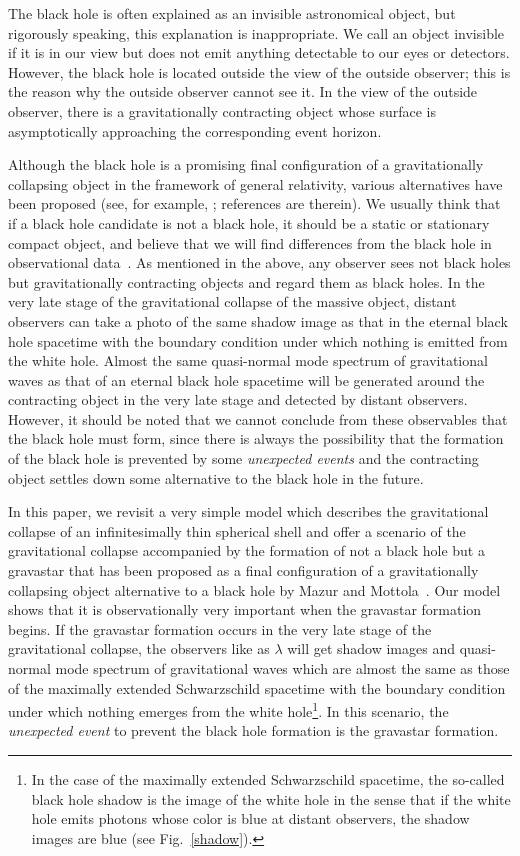 \documentclass[aps,preprint,preprintnumber,nofootinbib,amsmath,amssymb,ascmac,bm,12pt]{revtex4}
\begin{document}
The black hole is often explained as an invisible astronomical object, but rigorously speaking, 
this explanation is inappropriate. We call an object invisible if it is in our view but 
does not emit anything detectable to our eyes or detectors. However, the black hole 
is located outside the view of the outside observer; 
this is the reason why the outside observer cannot see it.    
In the view of the outside observer, there is a gravitationally contracting object  
whose surface is asymptotically approaching the corresponding event horizon. 

Although the black hole is a promising final configuration of a gravitationally collapsing object in the 
framework of general relativity, various alternatives have been proposed 
 (see, for example, \cite{CP2017}; references are therein).  
We usually think that if a black hole candidate is not a black hole, it should be a static or stationary 
compact object, and believe that we will find differences from the 
black hole in observational data~\cite{CP2017}.
As mentioned in the above, any observer sees not black holes but gravitationally contracting objects and regard  
them as black holes. In the very late stage of the gravitational collapse of the massive object, 
distant observers can take a photo of the same shadow image as that in the eternal black hole spacetime 
with the boundary condition under which nothing is emitted from the white hole.  
Almost the same quasi-normal mode spectrum of gravitational waves as that 
of an eternal black hole spacetime will be generated around the contracting object in the very late stage 
and detected by distant observers. 
However, it should be noted that we cannot conclude from these observables that 
the black hole must form, since 
there is always the possibility that the formation of the black hole is prevented by some {\it unexpected 
events} and the contracting object settles down some alternative to the black hole in the future. 

In this paper, we revisit a very simple model which describes the gravitational collapse of 
an infinitesimally thin spherical shell and offer a scenario of the gravitational collapse  
accompanied by the formation of not a black hole but a gravastar that has been proposed as a 
final configuration of a gravitationally collapsing object alternative to a black hole 
by Mazur and Mottola~\cite{MM2004}. 
Our model shows that it is observationally very important when the gravastar formation begins. 
If the gravastar formation occurs in the very late stage of the gravitational collapse, 
the observers like as $\lambda$ will get shadow images and  
quasi-normal mode spectrum of gravitational waves which are almost the same as 
those of the maximally extended Schwarzschild spacetime 
with the boundary condition under which nothing 
emerges from the white hole\footnote{In the case of the maximally extended Schwarzschild spacetime, 
the so-called black hole shadow is the image of the white hole in the sense that if the white hole emits 
photons whose color is blue at distant observers, the shadow images are blue (see Fig.~\ref{shadow}).}. 
In this scenario, the {\it unexpected event} to prevent the black hole formation is the gravastar formation.   
\end{document}
